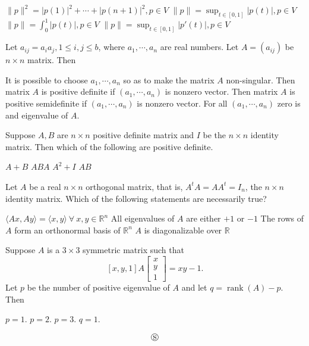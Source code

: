 \documentclass[10pt]{exam}
\DeclareMathOperator{\rank}{\text{rank}}
\begin{document}
\begin{questions}
\begin{checkboxes}
\choice $\|p \|^2 = |p(1)|^2 + \cdots + |p(n + 1)|^2, p \in V $
\choice $\|p \| = \sup_{t \in [0,1]}|p(t)|, p \in V $
\choice $\|p \| = \int_0^1 |p(t)|, p \in V $
\choice $\|p \| = \sup_{t \in [0,1]}|p'(t)|, p \in V $
\end{checkboxes}


\question
Let $a_{ij}=a_ia_j, 1 \leq i, j\leq b$, where $a_1,\cdots , a_n$ are real numbers. Let $A=(a_{ij})$ be $n\times n$ matrix. Then 

\begin{checkboxes}
\choice It is possible to choose $a_1,\cdots , a_n$ so as to make the matrix $A$ non-singular.
\choice Then matrix $A$ is positive definite if $(a_1,\cdots , a_n)$ is nonzero vector.
\choice Then matrix $A$ is positive semidefinite if $(a_1,\cdots , a_n)$ is nonzero vector.
\choice For all $(a_1,\cdots , a_n)$ zero is and eigenvalue of $A$.
\end{checkboxes}

\question 
Suppose $A,B$ are $n \times n$ positive definite matrix and $I$ be the $n \times n$ identity matrix. Then which of the following are positive definite.

\begin{oneparcheckboxes}
\choice $A+B$
\choice $ABA$
\choice  $A^2+I$
\choice $AB$
\end{oneparcheckboxes}

\question 
Let $A$ be a real $n \times n$ orthogonal matrix, that is, $A^t A = AA^t = I_n$, the $n\times n$ identity matrix. Which of the following statements are necessarily true?

\begin{checkboxes}
\choice $\langle Ax, Ay \rangle = \langle x,y \rangle ~ \forall ~  x,y \in \mathbb{R}^n$
\choice All eigenvalues of $A$ are either $+1$ or $-1$ 
\choice The rows of $A$ form an orthonormal basis of $\mathbb{R}^n$ 
\choice $A $ is diagonalizable over $\mathbb{R}$
\end{checkboxes}

\question
Suppose $A$ is a $3 \times 3$ symmetric matrix such that 
$$[x,y,1]A\begin{bmatrix}
x \\ 
y \\ 
1
\end{bmatrix} =xy -1.$$
Let $p$ be the number of positive eigenvalue of $A$ and let $q=\rank(A)-p$. Then 

\begin{oneparcheckboxes}
\choice $p=1$.
\choice $p=2$.
\choice $p=3$.
\choice $q=1$.
\end{oneparcheckboxes} 

\end{questions}
$$\circledS$$
\end{document}
